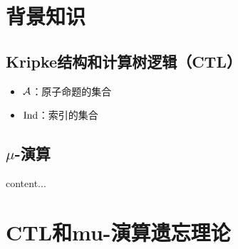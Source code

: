 \documentclass[9pt, CJK]{beamer}
\begin{document}
\section{背景知识}
\subsection{Kripke结构和计算树逻辑（CTL）}
\begin{frame}
	\begin{itemize}
		\item ${\cal A}$：原子命题的集合
		\item $\textrm{Ind}$：索引的集合
	\end{itemize}
\end{frame}
\subsection{$\mu$-演算}
\begin{frame}
	content...
\end{frame}
	
	\section{CTL和mu-演算遗忘理论}
\end{document}
